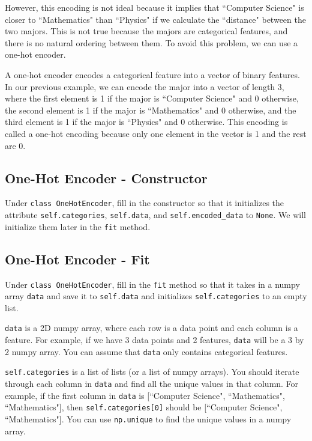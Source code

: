 \documentclass{article}
\begin{document}
However, this encoding is not ideal because it implies that ``Computer Science" is closer to ``Mathematics" than ``Physics" if we calculate the ``distance" between the two majors. This is not true because the majors are categorical features, and there is no natural ordering between them. To avoid this problem, we can use a one-hot encoder.

A one-hot encoder encodes a categorical feature into a vector of binary features. In our previous example, we can encode the major into a vector of length 3, where the first element is 1 if the major is ``Computer Science" and 0 otherwise, the second element is 1 if the major is ``Mathematics" and 0 otherwise, and the third element is 1 if the major is ``Physics" and 0 otherwise. This encoding is called a one-hot encoding because only one element in the vector is 1 and the rest are 0.

\subsection{ One-Hot Encoder - Constructor}
Under \verb|class OneHotEncoder|, fill in the constructor so that it initializes the attribute \verb|self.categories|, \verb|self.data|, and \verb|self.encoded_data| to \verb|None|. We will initialize them later in the \verb|fit| method.

\subsection{  One-Hot Encoder - Fit}
Under \verb|class OneHotEncoder|, fill in the \verb|fit| method so that it takes in a numpy array \verb|data| and save it to \verb|self.data| and initializes \verb|self.categories| to an empty list.

\verb|data| is a 2D numpy array, where each row is a data point and each column is a feature. For example, if we have 3 data points and 2 features, \verb|data| will be a 3 by 2 numpy array. You can assume that \verb|data| only contains categorical features.

\verb|self.categories| is a list of lists (or a list of numpy arrays). You should iterate through each column in \verb|data| and find all the unique values in that column. For example, if the first column in \verb|data| is [``Computer Science", ``Mathematics", ``Mathematics"], then \verb|self.categories[0]| should be [``Computer Science", ``Mathematics"]. You can use \verb|np.unique| to find the unique values in a numpy array.
\end{document}
